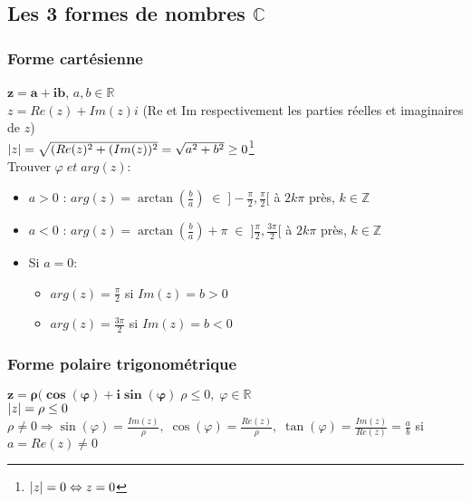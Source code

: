 \documentclass[10pt,a4paper]{book}
\newcommand{\R}{\mathbb{R}}
\newcommand{\Z}{\mathbb{Z}}
\newcommand{\C}{\mathbb{C}}
\DeclarePairedDelimiter\abs{\lvert}{\rvert}
\begin{document}
\subsection{Les 3 formes de nombres \texorpdfstring{$\C$}{complexes}}

\subsubsection{Forme cartésienne}

$\mathbf{z=a+ib}$, $a,b\in \R$ \\
$z = Re(z) + Im(z)i$ (Re et Im respectivement les parties réelles et imaginaires de $z$) \\
$\abs{z}= \sqrt{(Re(z)^2 + (Im(z))^2} = \sqrt{a^2 + b^2} \geq 0$\footnote{$\abs{z} = 0 \Leftrightarrow z = 0$} \\
Trouver $\varphi \; et\; arg(z)$:
\begin{itemize}
\item  $a>0$ : $arg(z) = \arctan(\frac{b}{a})\; \in \; ]-\frac{\pi}{2}, \frac{\pi}{2}[$ à $2k\pi$ près, $k\in \Z$
\item  $a<0$ : $arg(z) = \arctan(\frac{b}{a})+\pi \; \in \; ]\frac{\pi}{2}, \frac{3\pi}{2}[$ à $2k\pi$ près, $k\in \Z$
\item Si $a=0$:
\begin{itemize}
\item $arg(z) = \frac{\pi}{2}$ si $Im(z)=b > 0$
\item $arg(z) = \frac{3\pi}{2}$ si $Im(z)=b < 0$
\end{itemize}
\end{itemize}

\subsubsection{Forme polaire trigonométrique}

$\mathbf{z = \rho (\cos(\varphi) + i\sin(\varphi)} \; \rho \leq 0, \; \varphi \in \R$ \\
$\abs{z} = \rho \leq 0$
$\rho \neq 0 \Rightarrow \sin(\varphi) = \frac{Im(z)}{\rho}, \; \cos(\varphi) = \frac{Re(z)}{\rho}, \; \tan(\varphi) = \frac{Im(z)}{Re(z)} = \frac{a}{b}$ si $a = Re(z)\neq 0$
\end{document}
